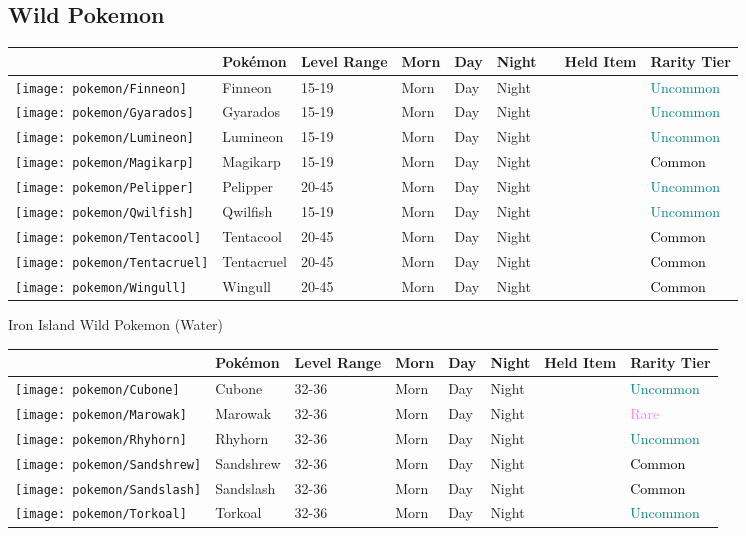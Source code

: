 \subsection{Wild Pokemon}%
\label{subsec:WildPokemon}%
\begin{longtable}{||l l l l l l l l l||}%
\hline%
&Pokémon&Level Range&Morn&Day&Night&&Held Item&Rarity Tier\\%
\hline%
\endhead%
\hline%
\texttt{[image: pokemon/Finneon]}&Finneon&15{-}19&Morn&Day&Night&&&\textcolor{teal}{%
Uncommon%
}\\%
\hline%
\texttt{[image: pokemon/Gyarados]}&Gyarados&15{-}19&Morn&Day&Night&&&\textcolor{teal}{%
Uncommon%
}\\%
\hline%
\texttt{[image: pokemon/Lumineon]}&Lumineon&15{-}19&Morn&Day&Night&&&\textcolor{teal}{%
Uncommon%
}\\%
\hline%
\texttt{[image: pokemon/Magikarp]}&Magikarp&15{-}19&Morn&Day&Night&&&\textcolor{black}{%
Common%
}\\%
\hline%
\texttt{[image: pokemon/Pelipper]}&Pelipper&20{-}45&Morn&Day&Night&&&\textcolor{teal}{%
Uncommon%
}\\%
\hline%
\texttt{[image: pokemon/Qwilfish]}&Qwilfish&15{-}19&Morn&Day&Night&&&\textcolor{teal}{%
Uncommon%
}\\%
\hline%
\texttt{[image: pokemon/Tentacool]}&Tentacool&20{-}45&Morn&Day&Night&&&\textcolor{black}{%
Common%
}\\%
\hline%
\texttt{[image: pokemon/Tentacruel]}&Tentacruel&20{-}45&Morn&Day&Night&&&\textcolor{black}{%
Common%
}\\%
\hline%
\texttt{[image: pokemon/Wingull]}&Wingull&20{-}45&Morn&Day&Night&&&\textcolor{black}{%
Common%
}\\%
\hline%
\end{longtable}%
\caption{Iron Island Wild Pokemon (Water)}%
\begin{longtable}{||l l l l l l l l||}%
\hline%
&Pokémon&Level Range&Morn&Day&Night&Held Item&Rarity Tier\\%
\hline%
\endhead%
\hline%
\texttt{[image: pokemon/Cubone]}&Cubone&32{-}36&Morn&Day&Night&&\textcolor{teal}{%
Uncommon%
}\\%
\hline%
\texttt{[image: pokemon/Marowak]}&Marowak&32{-}36&Morn&Day&Night&&\textcolor{violet}{%
Rare%
}\\%
\hline%
\texttt{[image: pokemon/Rhyhorn]}&Rhyhorn&32{-}36&Morn&Day&Night&&\textcolor{teal}{%
Uncommon%
}\\%
\hline%
\texttt{[image: pokemon/Sandshrew]}&Sandshrew&32{-}36&Morn&Day&Night&&\textcolor{black}{%
Common%
}\\%
\hline%
\texttt{[image: pokemon/Sandslash]}&Sandslash&32{-}36&Morn&Day&Night&&\textcolor{black}{%
Common%
}\\%
\hline%
\texttt{[image: pokemon/Torkoal]}&Torkoal&32{-}36&Morn&Day&Night&&\textcolor{teal}{%
Uncommon%
}\\%
\hline%
\end{longtable}%
